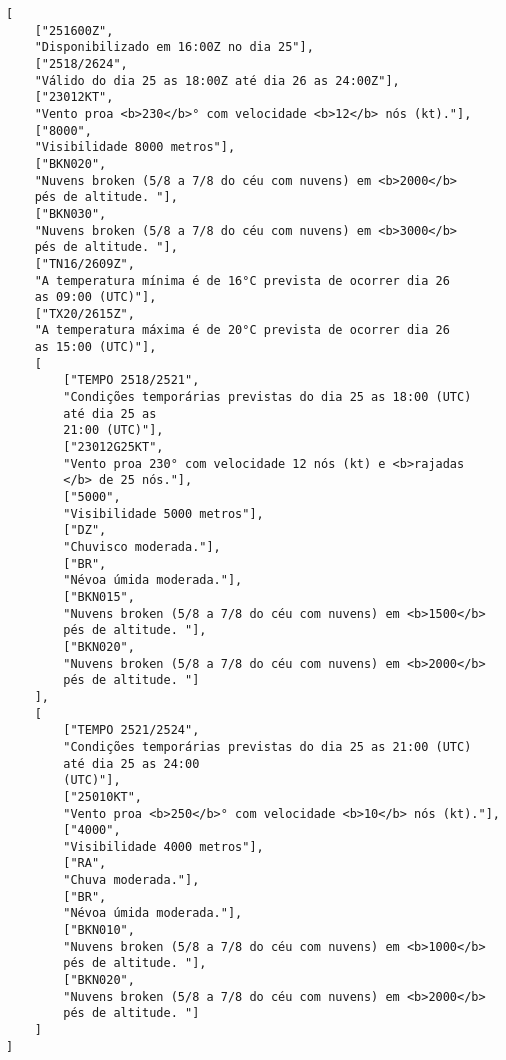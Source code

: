 \begin{verbatim}
[
    ["251600Z",
    "Disponibilizado em 16:00Z no dia 25"],
    ["2518/2624",
    "Válido do dia 25 as 18:00Z até dia 26 as 24:00Z"],
    ["23012KT",
    "Vento proa <b>230</b>° com velocidade <b>12</b> nós (kt)."],
    ["8000",
    "Visibilidade 8000 metros"],
    ["BKN020",
    "Nuvens broken (5/8 a 7/8 do céu com nuvens) em <b>2000</b> 
    pés de altitude. "],
    ["BKN030",
    "Nuvens broken (5/8 a 7/8 do céu com nuvens) em <b>3000</b> 
    pés de altitude. "],
    ["TN16/2609Z",
    "A temperatura mínima é de 16°C prevista de ocorrer dia 26 
    as 09:00 (UTC)"],
    ["TX20/2615Z",
    "A temperatura máxima é de 20°C prevista de ocorrer dia 26 
    as 15:00 (UTC)"],
    [
        ["TEMPO 2518/2521",
        "Condições temporárias previstas do dia 25 as 18:00 (UTC) 
        até dia 25 as 
        21:00 (UTC)"],
        ["23012G25KT",
        "Vento proa 230° com velocidade 12 nós (kt) e <b>rajadas
        </b> de 25 nós."],
        ["5000",
        "Visibilidade 5000 metros"],
        ["DZ",
        "Chuvisco moderada."],
        ["BR",
        "Névoa úmida moderada."],
        ["BKN015",
        "Nuvens broken (5/8 a 7/8 do céu com nuvens) em <b>1500</b> 
        pés de altitude. "],
        ["BKN020",
        "Nuvens broken (5/8 a 7/8 do céu com nuvens) em <b>2000</b> 
        pés de altitude. "]
    ],
    [
        ["TEMPO 2521/2524",
        "Condições temporárias previstas do dia 25 as 21:00 (UTC) 
        até dia 25 as 24:00 
        (UTC)"],
        ["25010KT",
        "Vento proa <b>250</b>° com velocidade <b>10</b> nós (kt)."],
        ["4000",
        "Visibilidade 4000 metros"],
        ["RA",
        "Chuva moderada."],
        ["BR",
        "Névoa úmida moderada."],
        ["BKN010",
        "Nuvens broken (5/8 a 7/8 do céu com nuvens) em <b>1000</b> 
        pés de altitude. "],
        ["BKN020",
        "Nuvens broken (5/8 a 7/8 do céu com nuvens) em <b>2000</b> 
        pés de altitude. "]
    ]
]
\end{verbatim}
